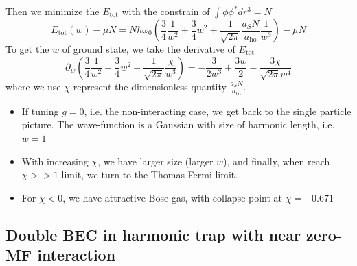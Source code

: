 Then we minimize the $E_{\text{tot} }$ with the constrain of $\int\phi\phi^*dr^3=N$
\begin{equation}
E_{\text{tot}}(w)-\mu N=N \hbar  \omega _0\left(\frac{3}{4}\frac{1}{w^2}+\frac{3}{4}w^2+\frac{1}{\sqrt{2\pi }}\frac{a_SN}{a_{\text{ho}}}\frac{1}{w^3}\right)-\mu  N
\end{equation}
To get the $w$ of ground state, we take the derivative of $E_{\text{tot}}$
\begin{equation}
{\partial _w\left(\frac{3}{4}\frac{1}{w^2}+\frac{3}{4}w^2+\frac{1}{\sqrt{2\pi }}\frac{\chi }{w^3}\right)}=-\frac{3}{2 w^3}+\frac{3 w}{2}-\frac{3 \chi }{\sqrt{2 \pi } w^4}
\end{equation}
where we use $\chi $ represent the dimensionless quantity $\frac{a_SN}{a_{\text{ho}}}$.

\begin{itemize}[noitemsep,topsep=0pt]
    \item If tuning $g=0$, i.e. the non-interacting case, we get back to the single particle picture. The wave-function is a Gaussian with size of harmonic length, i.e. $w=1$
    \item With increasing $\chi $, we have larger size (larger $w$), and finally, when reach $\chi >>1$ limit, we turn to the Thomas-Fermi limit.
    \item For $\chi <0$, we have attractive Bose gas, with collapse point at $\chi =-0.671$ \cite{}
\end{itemize}

\subsection{Double BEC in harmonic trap with near zero-MF interaction}


